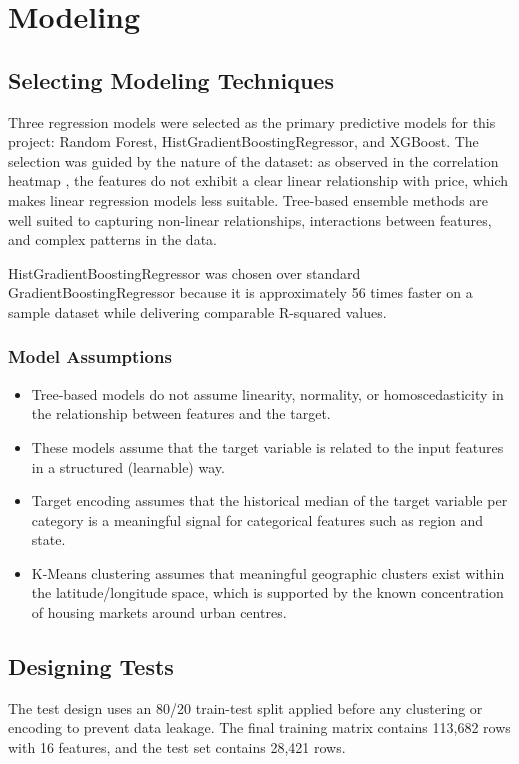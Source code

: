 \section{Modeling}

\subsection{Selecting Modeling Techniques}

\noindent
Three regression models were selected as the primary predictive models for this project: Random Forest, HistGradientBoostingRegressor, and XGBoost. The selection was guided by the nature of the dataset: as observed in the correlation heatmap%
, 
the features do not exhibit a clear linear relationship with price, which makes linear regression models less suitable. Tree-based ensemble methods are well suited to capturing non-linear relationships, interactions between features, and complex patterns in the data.

\noindent
HistGradientBoostingRegressor was chosen over standard GradientBoostingRegressor because it is approximately 56 times faster on a sample dataset while delivering comparable R-squared values.

\subsubsection{Model Assumptions}
\vspace{-12pt}
\begin{itemize} [itemsep = -9pt]
    \item Tree-based models do not assume linearity, normality, or homoscedasticity in the relationship between features and the target.
    \item These models assume that the target variable is related to the input features in a structured (learnable) way.
    \item Target encoding assumes that the historical median of the target variable per category is a meaningful signal for categorical features such as region and state.
    \item K-Means clustering assumes that meaningful geographic clusters exist within the latitude/longitude space, which is supported by the known concentration of housing markets around urban centres.
\end{itemize}

\subsection{Designing Tests}
\label{subsec:Designing Tests}
\noindent
The test design uses an 80/20 train-test split applied before any clustering or encoding to prevent data leakage. The final training matrix contains 113,682 rows with 16 features, and the test set contains 28,421 rows.


